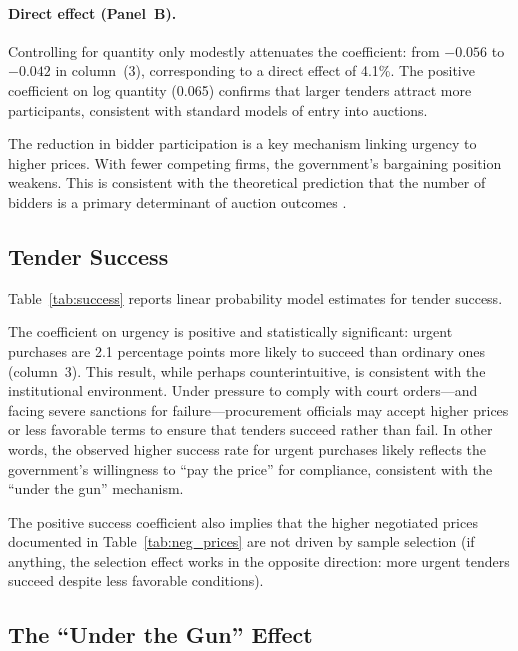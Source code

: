 \paragraph{Direct effect (Panel~B).}
Controlling for quantity only modestly attenuates the coefficient: from $-0.056$ to $-0.042$ in column~(3), corresponding to a direct effect of 4.1\%. The positive coefficient on log quantity (0.065) confirms that larger tenders attract more participants, consistent with standard models of entry into auctions.

The reduction in bidder participation is a key mechanism linking urgency to higher prices. With fewer competing firms, the government's bargaining position weakens. This is consistent with the theoretical prediction that the number of bidders is a primary determinant of auction outcomes \citep{bulow1996auctions}.

\subsection{Tender Success}
\label{sec:success}

Table~\ref{tab:success} reports linear probability model estimates for tender success.



The coefficient on urgency is positive and statistically significant: urgent purchases are 2.1 percentage points more likely to succeed than ordinary ones (column~3). This result, while perhaps counterintuitive, is consistent with the institutional environment. Under pressure to comply with court orders---and facing severe sanctions for failure---procurement officials may accept higher prices or less favorable terms to ensure that tenders succeed rather than fail. In other words, the observed higher success rate for urgent purchases likely reflects the government's willingness to ``pay the price'' for compliance, consistent with the ``under the gun'' mechanism.

The positive success coefficient also implies that the higher negotiated prices documented in Table~\ref{tab:neg_prices} are not driven by sample selection (if anything, the selection effect works in the opposite direction: more urgent tenders succeed despite less favorable conditions).

\subsection{The ``Under the Gun'' Effect}
\label{sec:utg}

